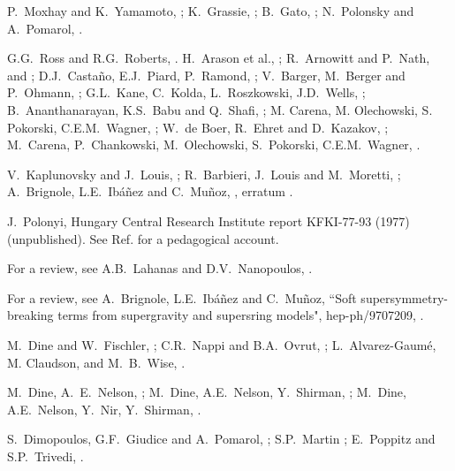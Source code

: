 \begin{thebibliography}{99}
P.~Moxhay and K.~Yamamoto, ;
K.~Grassie, ;
B.~Gato, ;
N.~Polonsky and A.~Pomarol, .

G.G.~Ross and R.G.~Roberts,
.
H.~Arason et al., ;
R.~Arnowitt and P.~Nath,
 and ;
D.J.~Casta\~no, E.J.~Piard, P.~Ramond,
;
V.~Barger, M.~Berger and P.~Ohmann, ;
G.L.~Kane, C.~Kolda, L.~Roszkowski, J.D.~Wells,
;
B.~Ananthanarayan, K.S.~Babu and Q.~Shafi, ;
M. Carena, M. Olechowski, S. Pokorski, C.E.M.~Wagner,
;
W.~de Boer, R.~Ehret and D.~Kazakov, ;
M.~Carena, P.~Chankowski, M.~Olechowski, S.~Pokorski, C.E.M.~Wagner,
.

V.~Kaplunovsky and J.~Louis, ;
R.~Barbieri, J.~Louis and M.~Moretti, ;
A.~Brignole, L.E.~Ib\'a\~nez and  C.~Mu\~noz,
, erratum .

 J.~Polonyi, Hungary Central Research Institute
report KFKI-77-93 (1977) (unpublished). See Ref.\cite{BailinLovebook}
for a pedagogical account.

 For a review, see
A.B.~Lahanas and D.V.~Nanopoulos, .

 For a review, see A.~Brignole, L.E.~Ib\'a\~nez and
C.~Mu\~noz, ``Soft supersymmetry-breaking terms from supergravity
and supersring models",
hep-ph/9707209,
\perspectives.

 M.~Dine and W.~Fischler,
; C.R.~Nappi and B.A.~Ovrut,
; L.~Alvarez-Gaum\'e, M. Claudson,
and M.~B.~Wise, .

 M.~Dine, A.~E.~Nelson,
;
M.~Dine, A.E.~Nelson, Y.~Shirman, ;
M.~Dine, A.E.~Nelson, Y.~Nir, Y.~Shirman, .

 S.~Dimopoulos, G.F.~Giudice and
A.~Pomarol, ;
S.P.~Martin ;
E.~Poppitz and S.P.~Trivedi, .


\end{thebibliography}
